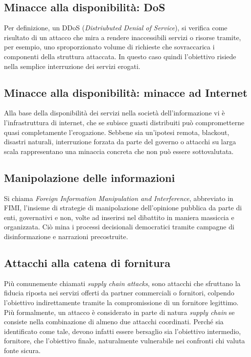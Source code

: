 \documentclass[12pt,a4paper,openright,twoside]{report}
\begin{document}
\subsection{Minacce alla disponibilit\`a: DoS}
Per definizione, un DDoS (\textit{Distriubuted Denial of Service}), si verifica come risultato di un attacco che mira a rendere inaccessibili servizi o risorse tramite, per esempio, uno sproporzionato volume di richieste che sovraccarica i componenti della struttura attaccata.
In questo caso quindi l'obiettivo risiede nella semplice interruzione dei servizi erogati.\\

\subsection{Minacce alla disponibilit\`a: minacce ad Internet}
Alla base della disponibilit\`a dei servizi nella societ\`a dell'informazione vi \`e l'infrastruttura di internet, che se subisce guasti distribuiti pu\`o comprometterne quasi completamente l'erogazione. Sebbene sia un'ipotesi remota,  blackout, disastri naturali, interruzione forzata da parte del governo o attacchi su larga scala rappresentano una minaccia concreta che non pu\`o essere sottovalutata.\\

\subsection{Manipolazione delle informazioni}
Si chiama \textit{Foreign Information Manipulation and Interference}, abbreviato in FIMI, l'insieme di strategie di manipolazione dell'opinione pubblica da parte di enti, governativi e non, volte ad inserirsi nel dibattito in maniera massiccia e organizzata. Ci\`o mina i processi decisionali democratici tramite campagne di disinformazione e narrazioni precostruite.\\
\subsection{Attacchi alla catena di fornitura}
Pi\`u comunemente  chiamati \textit{supply chain attacks}, sono attacchi che sfruttano la fiducia riposta nei servizi offerti da partner commerciali o fornitori, colpendo l'obiettivo indirettamente tramite la compromissione di un fornitore legittimo.\\
Pi\`u formalmente, un attacco \`e considerato in parte di natura \textit{supply chain} se consiste nella combinazione di almeno due attacchi coordinati. Perch\'e sia identificato come tale, devono infatti essere bersaglio sia l'obiettivo intermedio, fornitore, che l'obiettivo finale, naturalmente vulnerabile nei confronti chi valuta fonte sicura. \\
\end{document}
